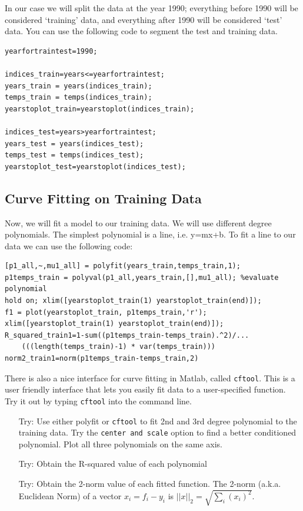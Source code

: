 \documentclass[12pt]{article}
\begin{document}
In our case we will split the data at the year 1990; everything before 1990 will be considered `training' data, and everything after 1990 will be considered `test' data. You can use the following code to segment the test and training data. 

\begin{lstlisting}[frame=single]
%% Split data into training set and test set
yearfortraintest=1990;

indices_train=years<=yearfortraintest;
years_train = years(indices_train);
temps_train = temps(indices_train);
yearstoplot_train=yearstoplot(indices_train);

indices_test=years>yearfortraintest;
years_test = years(indices_test);
temps_test = temps(indices_test);
yearstoplot_test=yearstoplot(indices_test);
\end{lstlisting}

\subsection{Curve Fitting on Training Data}
Now, we will fit a model to our training data. We will use different degree polynomials. The simplest polynomial is a line, i.e. y=mx+b. To fit a line to our data we can use the following code:

\begin{lstlisting}[frame=single]
%Fit 1-degree polynomial
[p1_all,~,mu1_all] = polyfit(years_train,temps_train,1);
p1temps_train = polyval(p1_all,years_train,[],mu1_all); %evaluate polynomial
hold on; xlim([yearstoplot_train(1) yearstoplot_train(end)]);
f1 = plot(yearstoplot_train, p1temps_train,'r'); 
xlim([yearstoplot_train(1) yearstoplot_train(end)]);
R_squared_train1=1-sum((p1temps_train-temps_train).^2)/...
    (((length(temps_train)-1) * var(temps_train)))
norm2_train1=norm(p1temps_train-temps_train,2)
\end{lstlisting}

There is also a nice interface for curve fitting in Matlab, called \lstinline|cftool|. This is a user friendly interface that lets you easily fit data to a user-specified function. Try it out by typing   \lstinline|cftool| into the command line. 

\begin{enumerate}
\item[Try:] Use either polyfit or \lstinline|cftool| to fit 2nd and 3rd degree polynomial to the training data. Try the \lstinline|center and scale| option to find a better conditioned polynomial.  Plot all three polynomials on the same axis. 
\item[Try:] Obtain the R-squared value of each polynomial
\item[Try:] Obtain the 2-norm value of each fitted function. The 2-norm (a.k.a. Euclidean Norm) of a vector $x_i = f_i-y_i$  is $||x||_2=\sqrt{\sum_i(x_i)^2}$. 
\end{enumerate}
\end{document}
